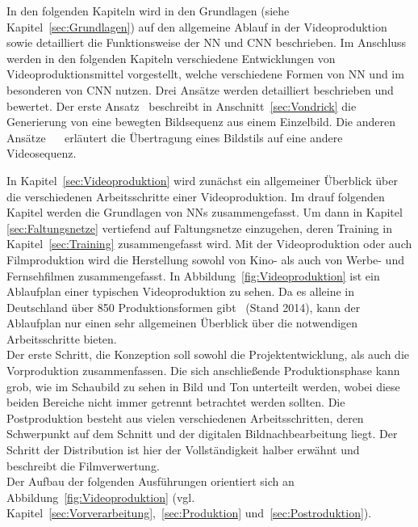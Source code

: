 \documentclass[times, 12pt,twocolumn]{article}
\begin{document}
In den folgenden Kapiteln wird in den Grundlagen (siehe Kapitel~\ref{sec:Grundlagen}) auf den allgemeine Ablauf in der Videoproduktion sowie detailliert die Funktionsweise der NN und CNN beschrieben. Im Anschluss werden in den folgenden Kapiteln verschiedene Entwicklungen von Videoproduktionsmittel vorgestellt, welche verschiedene Formen von NN und im besonderen von CNN nutzen. Drei Ansätze werden detailliert beschrieben und bewertet. Der erste Ansatz~\cite{VondrickPT16} beschreibt in Anschnitt~\ref{sec:Vondrick} die Generierung von eine bewegten Bildsequenz aus einem Einzelbild. Die anderen Ansätze~ \cite{DeepDream}~\cite{GatysEB15a} erläutert die Übertragung eines Bildstils auf eine andere Videosequenz.


 \label{sec:Grundlagen}
In Kapitel~\ref{sec:Videoproduktion} wird zunächst ein allgemeiner Überblick über die verschiedenen Arbeitsschritte einer Videoproduktion. Im drauf folgenden Kapitel werden die Grundlagen von NNs zusammengefasst. Um dann in Kapitel \ref{sec:Faltungsnetze} vertiefend auf Faltungsnetze einzugehen, deren Training in Kapitel~\ref{sec:Training} zusammengefasst wird. 
 \label{sec:Videoproduktion}
Mit der Videoproduktion oder auch Filmproduktion wird die Herstellung sowohl von Kino- als auch von Werbe- und Fernsehfilmen zusammengefasst. In Abbildung~\ref{fig:Videoproduktion} ist ein Ablaufplan einer typischen Videoproduktion zu sehen. Da es alleine in Deutschland über 850 Produktionsformen gibt~\cite{formatt} (Stand 2014), kann der Ablaufplan nur einen sehr allgemeinen Überblick über die notwendigen Arbeitsschritte bieten. \\
Der erste Schritt, die Konzeption soll sowohl die Projektentwicklung, als auch die Vorproduktion zusammenfassen. Die sich anschließende Produktionsphase kann grob, wie im Schaubild zu sehen in Bild und Ton unterteilt werden, wobei diese beiden Bereiche nicht immer getrennt betrachtet werden sollten. Die Postproduktion besteht aus vielen verschiedenen Arbeitsschritten, deren Schwerpunkt auf dem Schnitt und der digitalen Bildnachbearbeitung liegt. Der Schritt der Distribution ist hier der Vollständigkeit halber erwähnt und beschreibt die Filmverwertung. \\

Der Aufbau der folgenden Ausführungen orientiert sich an Abbildung~\ref{fig:Videoproduktion} (vgl. Kapitel~\ref{sec:Vorverarbeitung},~\ref{sec:Produktion} und~\ref{sec:Postroduktion}).
\end{document}
